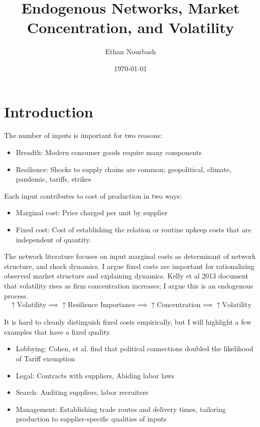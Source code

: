\documentclass{article}
\title{Endogenous Networks, Market Concentration, and Volatility}
\author{Ethan Nourbash}
\date{\today}
\begin{document}
\maketitle
\section{Introduction}
The number of inputs is important for two reasons:
\begin{itemize}
    \item Breadth: Modern consumer goods require many components
    \item Resilience: Shocks to supply chains are common; geopolitical, climate, pandemic, tariffs, strikes
\end{itemize}
Each input contributes to cost of production in two ways:
\begin{itemize}
    \item Marginal cost: Price charged per unit by supplier
    \item Fixed cost: Cost of establishing the relation or routine upkeep costs that are independent of quantity.
\end{itemize}
The network literature focuses on input marginal costs as determinant of network structure, and shock dynamics. I argue fixed costs are important for rationalizing observed market structure and explaining dynamics.
Kelly et al 2013 document that volatility rises as firm concentration increases; I argue this is an endogenous process.
\begin{align*}
   \uparrow  \text{Volatility} \implies \uparrow \text{Resilience Importance} \implies \uparrow \text{Concentration} \implies \uparrow \text{Volatility}
\end{align*}

It is hard to cleanly distinguish fixed costs empirically, but I will highlight a few examples that have a fixed quality.
\begin{itemize}
    \item Lobbying: Cohen, et al. find that political connections doubled the likelihood of Tariff exemption
    \item Legal: Contracts with suppliers, Abiding labor laws
    \item Search: Auditing suppliers, labor recruiters
    \item Management: Establishing trade routes and delivery times, tailoring production to supplier-specific qualities of inputs
\end{itemize}
\end{document}
